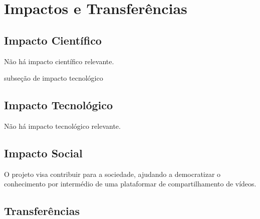 \documentclass[a4paper,10pt]{article} %
\begin{document}
\section{Impactos e Transferências}

\subsection{Impacto Científico}

Não há impacto científico relevante.

 subseção de impacto tecnológico %
\subsection{Impacto Tecnológico}

Não há impacto tecnológico relevante.



\subsection{Impacto Social}

O projeto visa contribuir para a sociedade, ajudando a democratizar o conhecimento por intermédio de uma plataformar de compartilhamento de vídeos. 



\subsection{Transferências}
\end{document}
